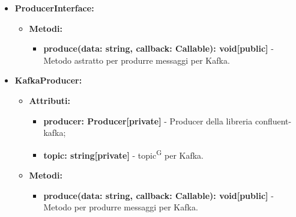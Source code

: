 \documentclass[8pt]{article}
\newcommand{\glossterm}[1]{#1\textsuperscript{G}} %
\begin{document}
\begin{itemize}
\begin{itemize}
\begin{itemize}
        \end{itemize}
    \end{itemize}
    \item \textbf{ProducerInterface:}
    \begin{itemize}
	\setlength\itemsep{0em}
        \item \textbf{Metodi:}
        \begin{itemize}
	\setlength\itemsep{0em}
            \item \textbf{produce(data: string, callback: Callable): void[public]} - Metodo astratto per produrre messaggi per Kafka.
        \end{itemize}
    \end{itemize}
    \item \textbf{KafkaProducer:}
    \begin{itemize}
	\setlength\itemsep{0em}
        \item \textbf{Attributi:}
        \begin{itemize}
	\setlength\itemsep{0em}
            \item \textbf{producer: Producer[private]} - Producer della libreria confluent-kafka;
            \item \textbf{topic: string[private]} - \glossterm{topic} per Kafka.
        \end{itemize}
        \item \textbf{Metodi:}
        \begin{itemize}
	\setlength\itemsep{0em}
            \item \textbf{produce(data: string, callback: Callable): void[public]} - Metodo per produrre messaggi per Kafka.
        \end{itemize}
    \end{itemize}
\end{itemize}
\end{document}
